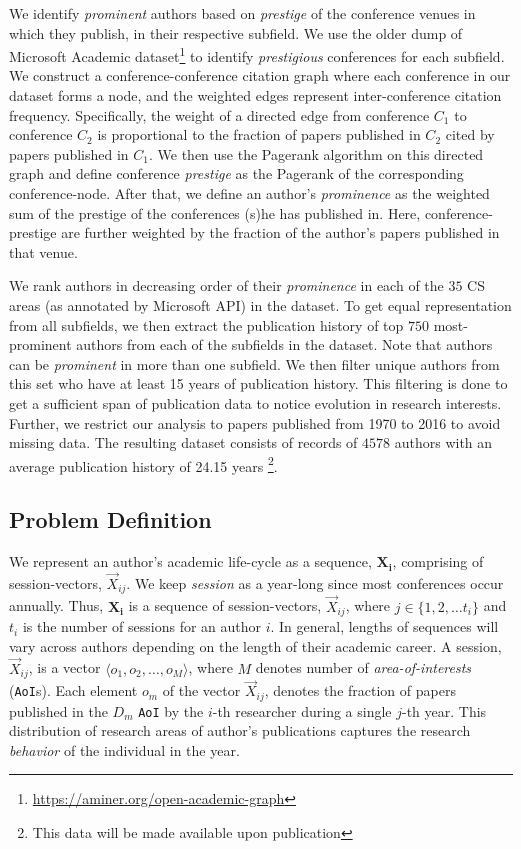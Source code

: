 \documentclass[10pt,letterpaper]{article}
\begin{document}
We identify \emph{prominent} authors based on \emph{prestige} of the conference venues in which they publish, in their respective subfield. We use the older dump of Microsoft Academic dataset\footnote{\url{https://aminer.org/open-academic-graph}} to identify \emph{prestigious} conferences for each subfield. We construct a conference-conference citation graph where each conference in our dataset forms a node, and the weighted edges represent inter-conference citation frequency. Specifically, the weight of a directed edge from conference $C_1$ to conference $C_2$ is proportional to the fraction of papers published in $C_2$ cited by papers published in $C_1$. We then use the Pagerank algorithm \cite{ilprints422} on this directed graph and define conference \emph{prestige} as the Pagerank of the corresponding conference-node. After that, we define an author's \emph{prominence} as the weighted sum of the prestige of the conferences (s)he has published in. Here, conference-prestige are further weighted by the fraction of the author's papers published in that venue.

We rank authors in decreasing order of their \emph{prominence} in each of the $35$ CS areas (as annotated by Microsoft API) in the dataset. To get equal representation from all subfields, we then extract the publication history of top $750$ most-prominent authors from each of the subfields in the dataset. Note that authors can be \emph{prominent} in more than one subfield. We then filter unique authors from this set who have at least 15 years of publication history. This filtering is done to get a sufficient span of publication data to notice evolution in research interests. Further, we restrict our analysis to papers published from 1970 to 2016 to avoid missing data. The resulting dataset consists of records of $4578$ authors with an average publication history of 24.15 years \footnote{This data will be made available upon publication}.

\subsection*{Problem Definition}
We represent an author's academic life-cycle as a sequence, $\mathbf{X_i}$, comprising of session-vectors, $\vec{X}_{ij}$. We keep \emph{session} as a year-long since most conferences occur annually. Thus, $\mathbf{X_i}$ is a sequence of session-vectors, $\vec{X}_{ij}$, where $j \in \{1, 2, \ldots t_i\}$ and $t_i$ is the number of sessions for an author $i$. In general, lengths of sequences will vary across authors depending on the length of their academic career.
A session, $\vec{X}_{ij}$, is a vector $\langle o_1, o_2, \ldots, o_M \rangle$, where $M$ denotes number of \emph{area-of-interests} (\texttt{AoI}s). Each element $o_m$ of the vector $\vec{X}_{ij}$, denotes the fraction of papers published in the $D_m$ \texttt{AoI} by the $i$-th researcher during a single $j$-th year. This distribution of research areas of author's publications captures the research \emph{behavior} of the individual in the year.
\end{document}
